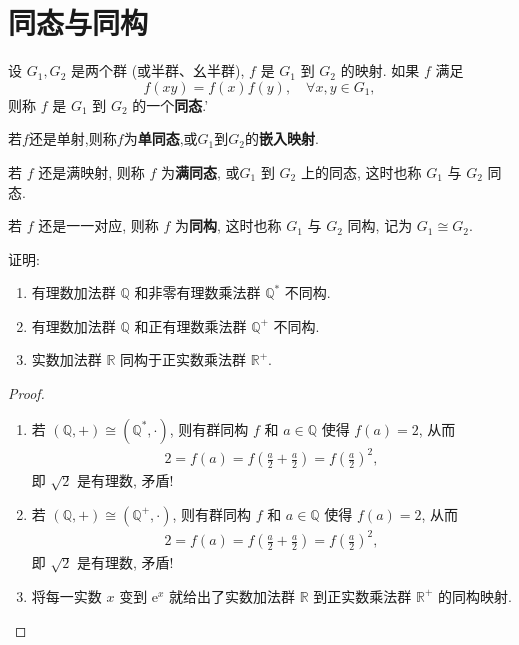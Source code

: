 \documentclass[../../main.tex]{subfiles}%
\begin{document}
\section{同态与同构}

\begin{definition}
设 \( G_1,G_2 \) 是两个群 (或半群、幺半群), \( f \) 是 \( G_1 \) 到 \( G_2 \) 的映射. 如果 \( f \) 满足
\[
f(xy) = f(x)f(y), \quad \forall x,y \in G_1,
\]
则称 \( f \) 是 \( G_1 \) 到 \( G_2 \) 的一个\textbf{同态}.'

若$f$还是单射,则称$f$为\textbf{单同态},或$G_1$到$G_2$的\textbf{嵌入映射}.

若 \( f \) 还是满映射, 则称 \( f \) 为\textbf{满同态}, 或\( G_1 \) 到 \( G_2 \) 上的同态, 这时也称 \( G_1 \) 与 \( G_2 \) 同态.

若 \( f \) 还是一一对应, 则称 \( f \) 为\textbf{同构}, 这时也称 \( G_1 \) 与 \( G_2 \) 同构, 记为 \( G_1 \cong G_2 \).
\end{definition}

\begin{example}
证明:
\begin{enumerate}[(1)]
\item 有理数加法群 $\mathbb{Q}$ 和非零有理数乘法群 $\mathbb{Q}^*$ 不同构.

\item 有理数加法群 $\mathbb{Q}$ 和正有理数乘法群 $\mathbb{Q}^+$ 不同构.

\item 实数加法群 $\mathbb{R}$ 同构于正实数乘法群 $\mathbb{R}^+$.
\end{enumerate}
\end{example}
\begin{proof}
\begin{enumerate}[(1)]
\item 若 $(\mathbb{Q},+)\cong (\mathbb{Q}^*,\cdot)$, 则有群同构 $f$ 和 $a\in \mathbb{Q}$ 使得 $f(a)=2$, 从而
\begin{align*}
2 = f(a) = f\left(\frac{a}{2} + \frac{a}{2}\right) = f\left(\frac{a}{2}\right)^2,
\end{align*}
即 $\sqrt{2}$ 是有理数, 矛盾!

\item 若 $(\mathbb{Q},+)\cong (\mathbb{Q}^+,\cdot)$, 则有群同构 $f$ 和 $a\in \mathbb{Q}$ 使得 $f(a)=2$, 从而
\begin{align*}
2 = f(a) = f\left(\frac{a}{2} + \frac{a}{2}\right) = f\left(\frac{a}{2}\right)^2,
\end{align*}
即 $\sqrt{2}$ 是有理数, 矛盾!

\item 将每一实数 $x$ 变到 $\mathrm{e}^x$ 就给出了实数加法群 $\mathbb{R}$ 到正实数乘法群 $\mathbb{R}^+$ 的同构映射.
\end{enumerate}
\end{proof}
\end{document}
